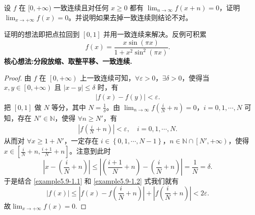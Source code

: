 \documentclass[../../main.tex]{subfiles}
\begin{document}
\begin{example}
设 \( f \) 在 \([0,+\infty)\) 一致连续且对任何 \( x \geq 0 \) 都有 \(\lim_{n \to \infty} f(x+n) = 0\)，证明 \(\lim_{x \to +\infty} f(x) = 0\)。并说明如果去掉一致连续则结论不对。
\end{example}
\begin{note}
证明的想法即把点拉回到 \([0,1]\) 并用一致连续来解决。反例可积累
\[
f(x) = \frac{x \sin (\pi x)}{1 + x^2 \sin^2 (\pi x)}.
\]
\textbf{核心想法:分段放缩、取整平移、一致连续.}
\end{note}
\begin{proof}
由 $f$ 在 $\left[ 0, +\infty \right)$ 上一致连续可知，$\forall \varepsilon > 0$，$\exists \delta > 0$，使得当 $x, y \in \left[ 0, +\infty \right)$ 且 $\left| x - y \right| \leqslant \delta$ 时，有
\begin{align}
\left| f\left( x \right) - f\left( y \right) \right| < \varepsilon. \label{example5.9-1.1}
\end{align}
把 $\left[ 0,1 \right]$ 做 $N$ 等分，其中 $N = \frac{1}{\delta}$。由 $\lim_{n \rightarrow \infty} f\left( \frac{i}{N} + n \right) = 0$，$i = 0, 1, \cdots, N$ 可知，存在 $N' \in \mathbb{N}$，使得 $\forall n \geqslant N'$，有
\begin{align}
\left| f\left( \frac{i}{N} + n \right) \right| < \varepsilon, \quad i = 0, 1, \cdots, N. \label{example5.9-1.2} 
\end{align}
从而对 $\forall x \geqslant 1 + N'$，一定存在 $i \in \left\{ 0, 1, \cdots, N - 1 \right\}$，$n \in \mathbb{N} \cap \left[ N', +\infty \right)$，使得 $x \in \left[ \frac{i}{N} + n, \frac{i + 1}{N} + n \right]$。注意到此时
\[
\left| x - \left( \frac{i}{N} + n \right) \right| \leqslant \left| \left( \frac{i + 1}{N} + n \right) - \left( \frac{i}{N} + n \right) \right| = \frac{1}{N} = \delta.
\]
于是结合 \eqref{example5.9-1.1} 和 \eqref{example5.9-1.2} 式我们就有
\[
\left| f\left( x \right) \right| \leqslant \left| f\left( x \right) - f\left( \frac{i}{N} + n \right) \right| + \left| f\left( \frac{i}{N} + n \right) \right| < 2\varepsilon.
\]
故\(\lim_{x \to +\infty} f(x) = 0\).
\end{proof}
\end{document}
